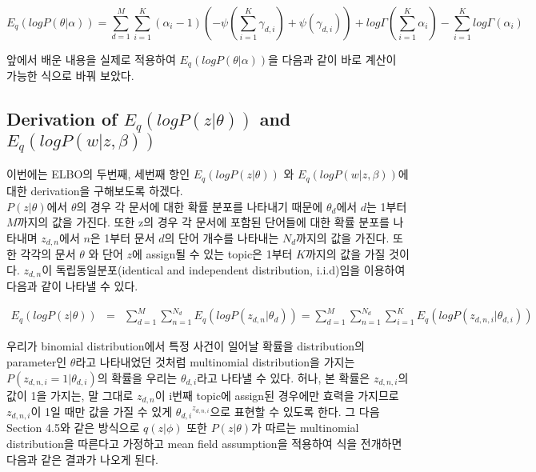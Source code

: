 \documentclass[draft=false]{oblivoir}
\begin{document}
\begin{equation}
E_{q}(logP(\theta|\alpha)) = \sum^{M}_{d=1}\sum^{K}_{i=1}(\alpha_{i}-1)\left(-\psi\left(\sum^{K}_{i=1}\gamma_{d,i}\right)+\psi(\gamma_{d,i})\right)+log\Gamma\left(\sum^{K}_{i=1}\alpha_{i}\right)-\sum^{K}_{i=1}log\Gamma(\alpha_{i})
\end{equation}

앞에서 배운 내용을 실제로 적용하여 $E_{q}(log P(\theta|\alpha))$을 다음과 같이 바로 계산이 가능한 식으로 바꿔 보았다.  
\subsection{Derivation of \texorpdfstring{$E_{q}(log P(z|\theta))$}{Lg}  and \texorpdfstring{$E_{q}(log P(w|z,\beta))$}{Lg}}
이번에는 ELBO의 두번째, 세번째 항인 $E_{q}(log P(z|\theta))$ 와 $E_{q}(log P(w|z,\beta))$에 대한 derivation을 구해보도록 하겠다. \\

$P(z|\theta)$에서 $\theta$의 경우 각 문서에 대한 확률 분포를 나타내기 때문에 $\theta_{d}$에서 $d$는 1부터 $M$까지의 값을 가진다. 또한 z의 경우 각 문서에 포함된 단어들에 대한 확률 분포를 나타내며 $z_{d,n}$에서 $n$은 1부터 문서 $d$의 단어 개수를 나타내는 $N_{d}$까지의 값을 가진다. 또한 각각의 문서 $\theta$ 와 단어 $z$에 assign될 수 있는 topic은 1부터 $K$까지의 값을 가질 것이다. $z_{d,n}$이 독립동일분포(identical and independent distribution, i.i.d)임을 이용하여 다음과 같이 나타낼 수 있다.

\begin{eqnarray}
E_{q}(log P(z|\theta))\nonumber & = &  \sum^{M}_{d=1}\sum^{N_{d}}_{n=1}E_{q}(logP(z_{d,n}|\theta_{d}))\nonumber = \sum^{M}_{d=1}\sum^{N_{d}}_{n=1}\sum^{K}_{i=1}E_{q}(logP(z_{d,n,i}|\theta_{d,i}))\nonumber
\end{eqnarray}

우리가 binomial distribution에서 특정 사건이 일어날 확률을 distribution의 parameter인 $\theta$라고 나타내었던 것처럼 multinomial distribution을 가지는 $P(z_{d,n,i}=1|\theta_{d,i})$의 확률을 우리는 $\theta_{d,i}$라고 나타낼 수 있다. 허나, 본 확률은 $z_{d,n,i}$의 값이 1을 가지는, 말 그대로 $z_{d,n}$이 i번째 topic에 assign된 경우에만 효력을 가지므로 $z_{d,n,i}$이 1일 때만 값을 가질 수 있게 ${\theta_{d,i}}^{z_{d,n,i}}$으로 표현할 수 있도록 한다.  그 다음 Section 4.5와 같은 방식으로 $q(z|\phi)$ 또한 $P(z|\theta)$가 따르는 multinomial distribution을 따른다고 가정하고 mean field assumption을 적용하여 식을 전개하면 다음과 같은 결과가 나오게 된다.
\end{document}
